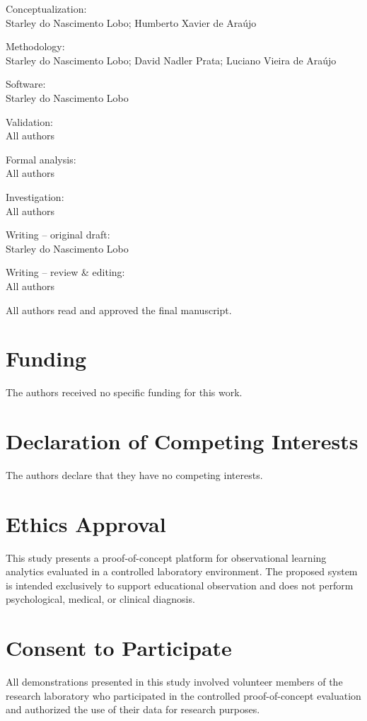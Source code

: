 \documentclass[12pt,a4paper]{article}
\begin{document}
Conceptualization:\\
Starley do Nascimento Lobo; Humberto Xavier de Araújo

Methodology:\\
Starley do Nascimento Lobo; David Nadler Prata; Luciano Vieira de Araújo

Software:\\
Starley do Nascimento Lobo

Validation:\\
All authors

Formal analysis:\\
All authors

Investigation:\\
All authors

Writing -- original draft:\\
Starley do Nascimento Lobo

Writing -- review \& editing:\\
All authors

All authors read and approved the final manuscript.

\section*{Funding}

The authors received no specific funding for this work.

\section*{Declaration of Competing Interests}

The authors declare that they have no competing interests.

\section*{Ethics Approval}

This study presents a proof-of-concept platform for observational learning analytics evaluated in a controlled laboratory environment. The proposed system is intended exclusively to support educational observation and does not perform psychological, medical, or clinical diagnosis.

\section*{Consent to Participate}

All demonstrations presented in this study involved volunteer members of the research laboratory who participated in the controlled proof-of-concept evaluation and authorized the use of their data for research purposes.
\end{document}
